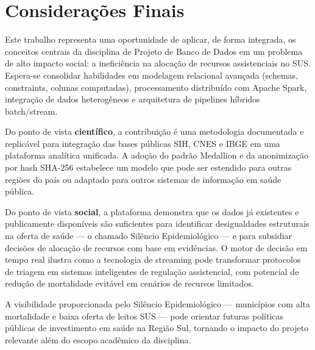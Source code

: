 \documentclass[12pt]{article}
\begin{document}
\section{Considerações Finais}

Este trabalho representa uma oportunidade de aplicar, de forma integrada,
os conceitos centrais da disciplina de Projeto de Banco de Dados em um problema
de alto impacto social: a ineficiência na alocação de recursos assistenciais
no SUS. Espera-se consolidar habilidades em modelagem relacional avançada
(schemas, constraints, colunas computadas), processamento distribuído com
Apache Spark, integração de dados heterogêneos e arquitetura de pipelines
híbridos batch/stream.

Do ponto de vista \textbf{científico}, a contribuição é uma metodologia
documentada e replicável para integração das bases públicas SIH, CNES e IBGE
em uma plataforma analítica unificada. A adoção do padrão Medallion e da
anonimização por hash SHA-256 estabelece um modelo que pode ser estendido para
outras regiões do país ou adaptado para outros sistemas de informação em saúde
pública.

Do ponto de vista \textbf{social}, a plataforma demonstra que os dados já
existentes e publicamente disponíveis são suficientes para identificar
desigualdades estruturais na oferta de saúde — o chamado Silêncio
Epidemiológico — e para subsidiar decisões de alocação de recursos com base
em evidências. O motor de decisão em tempo real ilustra como a tecnologia de
streaming pode transformar protocolos de triagem em sistemas inteligentes de
regulação assistencial, com potencial de redução de mortalidade evitável em
cenários de recursos limitados.

A visibilidade proporcionada pelo Silêncio Epidemiológico — municípios com
alta mortalidade e baixa oferta de leitos SUS — pode orientar futuras políticas
públicas de investimento em saúde na Região Sul, tornando o impacto do projeto
relevante além do escopo acadêmico da disciplina.


\end{document}
